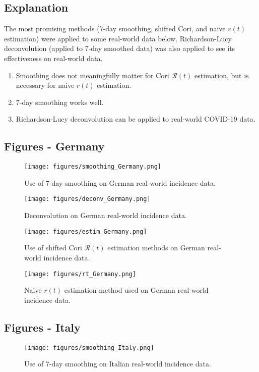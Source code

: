 \documentclass{article}
\newcommand{\nR}{\mathscr{R}}
\newcommand{\nr}{r}
\begin{document}
\subsection{Explanation}
The most promising methods (7-day smoothing, shifted Cori, and naive $\nr(t)$ estimation) were applied to some real-world data below.  Richardson-Lucy deconvolution (applied to 7-day smoothed data) was also applied to see its effectiveness on real-world data.

\begin{enumerate}
    \item Smoothing does not meaningfully matter for Cori $\nR(t)$ estimation, but is necessary for naive $\nr(t)$ estimation.
    \item 7-day smoothing works well. 
    \item Richardson-Lucy deconvolution can be applied to real-world COVID-19 data.
\end{enumerate}


\subsection{Figures - Germany}
\begin{figure}[h!]
    \centering
    \texttt{[image: figures/smoothing\_Germany.png]}
    \caption{Use of 7-day smoothing on German real-world incidence data.}
    \label{fig:my_label}
\end{figure}

\begin{figure}
    \centering
    \texttt{[image: figures/deconv\_Germany.png]}
    \caption{Deconvolution on German real-world incidence data.}
    \label{fig:my_label}
\end{figure}

\begin{figure}[h!]
    \centering
    \texttt{[image: figures/estim\_Germany.png]}
    \caption{Use of shifted Cori $\nR(t)$ estimation methods on German real-world incidence data.}
    \label{fig:my_label}
\end{figure}

\clearpage
\begin{figure}[h!]
    \centering
    \texttt{[image: figures/rt\_Germany.png]}
    \caption{Naive $\nr(t)$ estimation method used on German real-world incidence data.}
    \label{fig:my_label}
\end{figure}

\clearpage
\subsection{Figures - Italy}
\begin{figure}[h!]
    \centering
    \texttt{[image: figures/smoothing\_Italy.png]}
    \caption{Use of 7-day smoothing on Italian real-world incidence data.}
    \label{fig:my_label}
\end{figure}
\end{document}

